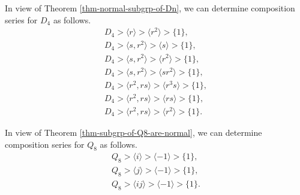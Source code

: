 \begin{example}
	In view of Theorem \ref{thm-normal-subgrp-of-Dn}, we can determine composition series for $D_4$ as follows.
	\begin{gather*}
		D_4 > \langle r \rangle > \langle r^2 \rangle > \{1\}, \\
		D_4 > \langle s, r^2 \rangle > \langle s \rangle > \{1\}, \\
		D_4 > \langle s, r^2 \rangle > \langle r^2 \rangle > \{1\}, \\
		D_4 > \langle s, r^2 \rangle > \langle sr^2 \rangle > \{1\}, \\
		D_4 > \langle r^2, rs \rangle > \langle r^3s \rangle > \{1\}, \\
		D_4 > \langle r^2, rs \rangle > \langle rs \rangle > \{1\}, \\
		D_4 > \langle r^2, rs \rangle > \langle r^2 \rangle > \{1\}.
	\end{gather*}
\end{example}
\begin{example}
	In view of Theorem \ref{thm-subgrp-of-Q8-are-normal}, we can determine composition series for $Q_8$ as follows.
	\begin{gather*}
		Q_8 > \langle i \rangle > \langle -1\rangle > \{1\},
		\\
		Q_8 > \langle j \rangle > \langle -1\rangle > \{1\},
		\\
		Q_8 > \langle ij \rangle > \langle -1\rangle > \{1\}.
	\end{gather*}
\end{example}

